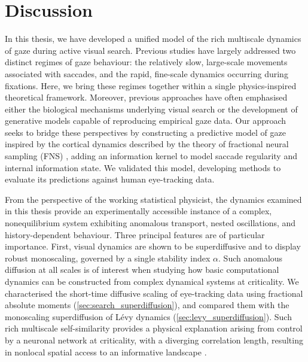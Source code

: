 \chapter{Discussion}\label{chap:discussion}

In this thesis, we have developed a unified model of the rich multiscale dynamics of gaze during active visual search. Previous studies have largely addressed two distinct regimes of gaze behaviour: the relatively slow, large-scale movements associated with saccades, and the rapid, fine-scale dynamics occurring during fixations. Here, we bring these regimes together within a single physics-inspired theoretical framework. Moreover, previous approaches have often emphasised either the biological mechanisms underlying visual search or the development of generative models capable of reproducing empirical gaze data. Our approach seeks to bridge these perspectives by constructing a predictive model of gaze inspired by the cortical dynamics described by the theory of fractional neural sampling (FNS) \cite{qi_fractional_2022, chen_spatiotemporal_2022}, adding an information kernel to model saccade regularity and internal information state. We validated this model, developing methods to evaluate its predictions against human eye-tracking data.

From the perspective of the working statistical physicist, the dynamics examined in this thesis provide an experimentally accessible instance of a complex, nonequilibrium system exhibiting anomalous transport, nested oscillations, and history-dependent behaviour. Three principal features are of particular importance. First, visual dynamics are shown to be superdiffusive and to display robust monoscaling, governed by a single stability index $\alpha$. Such anomalous diffusion at all scales is of interest when studying how basic computational dynamics can be constructed from complex dynamical systems at criticality. We characterised the short-time diffusive scaling of eye-tracking data using fractional absolute moments (\cref{sec:search_superdiffusion}), and compared them with the monoscaling superdiffusion of Lévy dynamics (\cref{sec:levy_superdiffusion}). Such rich multiscale self-similarity provides a physical explanation arising from control by a neuronal network at criticality, with a diverging correlation length, resulting in nonlocal spatial access to an informative landscape \cite{Meshulam_coarse_2019, santo_scalefree_2018, Beggs_criciality_2022, tkacik_critical_2015, cocchi_critical_2017}. 

